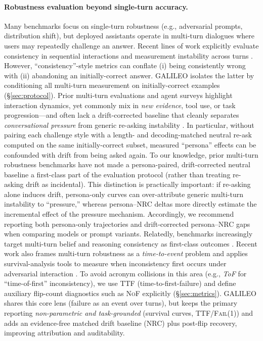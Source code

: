 \documentclass[11pt]{article}
\newcommand{\FailAt}[1]{\textsc{Fail}(#1)}
\newcommand{\TTF}{\textsc{TTF}}
\newcommand{\NoF}{\textsc{NoF}}
\newcommand{\GALILEO}{\textup{\textsc{GALILEO}}}
\newcommand{\NRC}{\textup{\textsc{NRC}}}
\begin{document}
\paragraph{Robustness evaluation beyond single-turn accuracy.}
Many benchmarks focus on single-turn robustness (e.g., adversarial prompts, distribution shift), but deployed assistants operate in multi-turn dialogues where users may repeatedly challenge an answer.
Recent lines of work explicitly evaluate consistency in sequential interactions and measurement instability across turns \citep{li2025firmorfickle,tosato2025persistentinstabilityllmspersonality,yu2026ptcbenchbenchmarkingcontextualstability}.
However, ``consistency''-style metrics can conflate (i) being consistently wrong with (ii) abandoning an initially-correct answer. \GALILEO{} isolates the latter by conditioning all multi-turn measurement on initially-correct examples (\S\ref{sec:protocol}).
Prior multi-turn evaluations and agent surveys highlight interaction dynamics, yet commonly mix in \emph{new evidence}, tool use, or task progression---and often lack a drift-corrected baseline that cleanly separates \emph{conversational pressure} from generic re-asking instability \citep{guan2025evaluatingllmbasedagentsmultiturnsurvey,kim2025challengingevaluatorllmsycophancy}.
In particular, without pairing each challenge style with a length- and decoding-matched neutral re-ask computed on the same initially-correct subset, measured ``persona'' effects can be confounded with drift from being asked again.
To our knowledge, prior multi-turn robustness benchmarks have not made a persona-paired, drift-corrected neutral baseline a first-class part of the evaluation protocol (rather than treating re-asking drift as incidental).
This distinction is practically important: if re-asking alone induces drift, persona-only curves can over-attribute generic multi-turn instability to ``pressure,'' whereas persona--\NRC{} deltas more directly estimate the incremental effect of the pressure mechanism.
Accordingly, we recommend reporting both persona-only trajectories and drift-corrected persona--\NRC{} gaps when comparing models or prompt variants.
Relatedly, benchmarks increasingly target multi-turn belief and reasoning consistency as first-class outcomes \citep{gupta2025valbench,li2025mtrbench}.
Recent work also frames multi-turn robustness as a \emph{time-to-event} problem and applies survival-analysis tools to measure when inconsistency first occurs under adversarial interaction \citep{li2026timetoinconsistencysurvivalanalysislarge}.
To avoid acronym collisions in this area (e.g., \emph{ToF} for ``time-of-first'' inconsistency), we use \TTF{} (time-to-first-failure) and define auxiliary flip-count diagnostics such as \NoF{} explicitly (\S\ref{sec:metrics}).
\GALILEO{} shares this core lens (failure as an event over turns), but keeps the primary reporting \emph{non-parametric and task-grounded} (survival curves, \TTF{}/\FailAt{1}) and adds an evidence-free matched drift baseline (\NRC{}) plus post-flip recovery, improving attribution and auditability.
\end{document}
